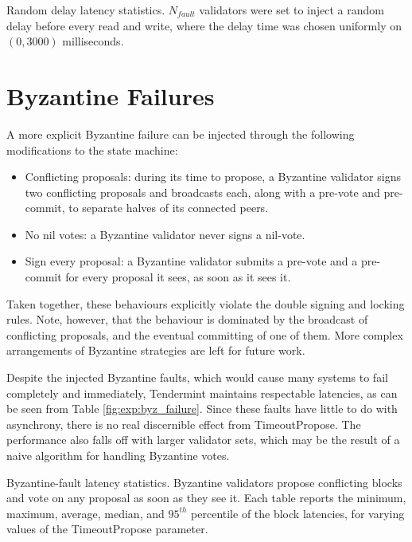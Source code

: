 \begin{table}[]
	
	\caption[Latency statistics under randomized delays]{Random delay latency statistics. $N_{fault}$ validators were set to inject a random delay
before every read and write, where the delay time was chosen uniformly on $(0, 3000)$ milliseconds.}
	\label{fig:exp:delay}
\end{table}


\section{Byzantine Failures}

A more explicit Byzantine failure can be injected through the following modifications
to the state machine:

\begin{itemize}
\item{Conflicting proposals: during its time to propose, a Byzantine validator signs two conflicting proposals and broadcasts each, along with a pre-vote and pre-commit, to separate halves of its connected peers.} 
\item{No nil votes: a Byzantine validator never signs a nil-vote.}
\item{Sign every proposal: a Byzantine validator submits a pre-vote and a pre-commit for every proposal it sees, as soon as it sees it.}
\end{itemize}

Taken together, these behaviours explicitly violate the double signing and locking rules. 
Note, however, that the behaviour is dominated by the broadcast of conflicting proposals,
and the eventual committing of one of them.
More complex arrangements of Byzantine strategies are left for future work.
 
Despite the injected Byzantine faults, 
which would cause many systems to fail completely and immediately,
Tendermint maintains respectable latencies, as can be seen from Table \ref{fig:exp:byz_failure}.
Since these faults have little to do with asynchrony,
there is no real discernible effect from TimeoutPropose.
The performance also falls off with larger validator sets,
which may be the result of a naive algorithm for handling Byzantine votes.

\begin{table}[]
	
	\caption[Latency statistics under byzantine faults]{Byzantine-fault latency statistics.
Byzantine validators propose conflicting blocks and vote on any proposal as soon as they see it.
Each table reports the minimum, maximum, average, median, and $95^{th}$ percentile of the block latencies, for varying values of the TimeoutPropose parameter.}
	\label{fig:exp:byz_failure}
\end{table}


